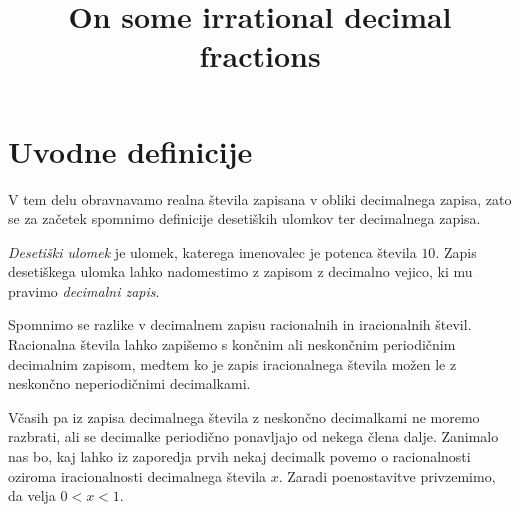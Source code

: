 \documentclass[twoside,11pt]{article}
\begin{document}




\klasifikacija{~} 


\title{On some irrational decimal fractions}



\glava\baselineskip=14.5pt

\smallskip


\section{Uvodne definicije}
V tem delu obravnavamo realna števila zapisana v obliki decimalnega zapisa,
zato se za začetek spomnimo definicije desetiških ulomkov ter decimalnega zapisa.

\begin{definicija}
    {\em Desetiški ulomek} je ulomek, katerega imenovalec je potenca števila $10$.
    Zapis desetiškega ulomka lahko
    nadomestimo z zapisom z decimalno vejico, ki mu pravimo {\em decimalni zapis}.
\end{definicija}

Spomnimo se razlike v decimalnem zapisu racionalnih in iracionalnih števil.
Racionalna števila lahko zapišemo
s končnim ali neskončnim periodičnim decimalnim zapisom, medtem ko je zapis iracionalnega števila možen 
le z neskončno neperiodičnimi decimalkami.

Včasih pa iz zapisa decimalnega števila z neskončno decimalkami ne moremo razbrati, ali 
se decimalke periodično ponavljajo od nekega člena dalje.
Zanimalo nas bo, kaj lahko iz zaporedja prvih nekaj decimalk povemo o racionalnosti oziroma iracionalnosti
decimalnega števila $x$.
Zaradi poenostavitve privzemimo, da velja $ 0 < x < 1$.
\end{document}
